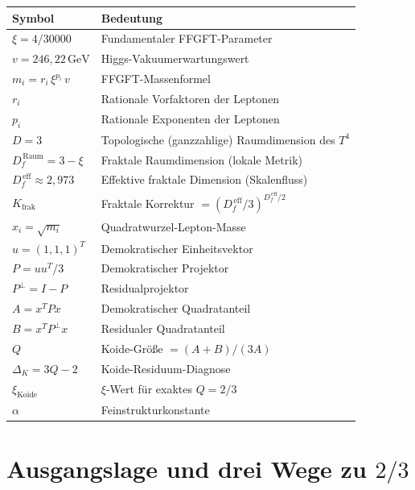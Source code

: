 \begin{center}
\renewcommand{\arraystretch}{1.4}
\begin{tabular}{ll}
\toprule
\textbf{Symbol} & \textbf{Bedeutung} \\
\midrule
\(\xi = 4/30000\) & Fundamentaler FFGFT-Parameter \cite{Pascher2026} \\
\(v = 246{,}22\,\text{GeV}\) & Higgs-Vakuumerwartungswert \\
\(m_i = r_i\,\xi^{p_i}\,v\) & FFGFT-Massenformel \cite{PascherDok006} \\
\(r_i\) & Rationale Vorfaktoren der Leptonen \\
\(p_i\) & Rationale Exponenten der Leptonen \cite{PascherDok051} \\
\(D = 3\) & Topologische (ganzzahlige) Raumdimension des \(T^4\) \\
\(D_f^{\,\text{Raum}} = 3-\xi\) & Fraktale Raumdimension (lokale Metrik) \cite{Pascher2026} \\
\(D_f^{\,\text{eff}} \approx 2{,}973\) & Effektive fraktale Dimension (Skalenfluss) \\
\(K_{\text{frak}}\) & Fraktale Korrektur \(= (D_f^{\,\text{eff}}/3)^{D_f^{\,\text{eff}}/2}\) \\
\(x_i = \sqrt{m_i}\) & Quadratwurzel-Lepton-Masse \\
\(u = (1,1,1)^T\) & Demokratischer Einheitsvektor \\
\(P = uu^T/3\) & Demokratischer Projektor \\
\(P^\perp = I - P\) & Residualprojektor \\
\(A = x^TPx\) & Demokratischer Quadratanteil \\
\(B = x^TP^\perp x\) & Residualer Quadratanteil \\
\(Q\) & Koide-Größe \(= (A+B)/(3A)\) \cite{Koide1983} \\
\(\Delta_K = 3Q-2\) & Koide-Residuum-Diagnose \\
\(\xi_{\text{Koide}}\) & \(\xi\)-Wert für exaktes \(Q = 2/3\) \\
\(\alpha\) & Feinstrukturkonstante \\
\bottomrule
\end{tabular}
\end{center}

\newpage

\section{Ausgangslage und drei Wege zu \(2/3\)}

